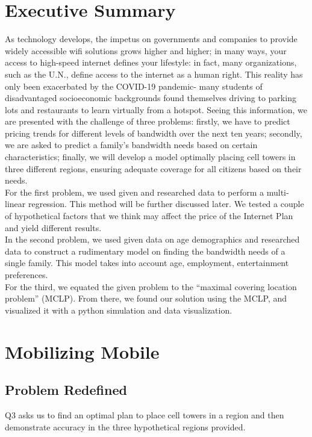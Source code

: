 
\section*{Executive Summary}

	As technology develops, the impetus on governments and companies to provide widely accessible wifi solutions grows higher and higher; in many ways, your access to high-speed internet defines your lifestyle: in fact, many organizations, such as the U.N., define access to the internet as a human right. This reality has only been exacerbated by the COVID-19 pandemic- many students of disadvantaged socioeconomic backgrounds found themselves driving to parking lots and restaurants to learn virtually from a hotspot. Seeing this information, we are presented with the challenge of three problems: firstly, we have to predict pricing trends for different levels of bandwidth over the next ten years; secondly, we are asked to predict a family’s bandwidth needs based on certain characteristics; finally, we will develop a model optimally placing cell towers in three different regions, ensuring adequate coverage for all citizens based on their needs.\\
	\indent For the first problem, we used given and researched data to perform a multi-linear regression. This method will be further discussed later. We tested a couple of hypothetical factors that we think may affect the price of the Internet Plan and yield different results. \\
	\indent In the second problem, we used given data on age demographics and researched data to construct a rudimentary model on finding the bandwidth needs of a single family. This model takes into account age, employment, entertainment preferences.\\ 
	\indent For the third, we equated the given problem to the “maximal covering location problem” (MCLP). From there, we found our solution using the MCLP, and visualized it with a python simulation and data visualization. 

 
\section*{Mobilizing Mobile}
	\subsection*{Problem Redefined}
	Q3 asks us to find an optimal plan to place cell towers in a region and then demonstrate accuracy in the three hypothetical regions provided.
		
